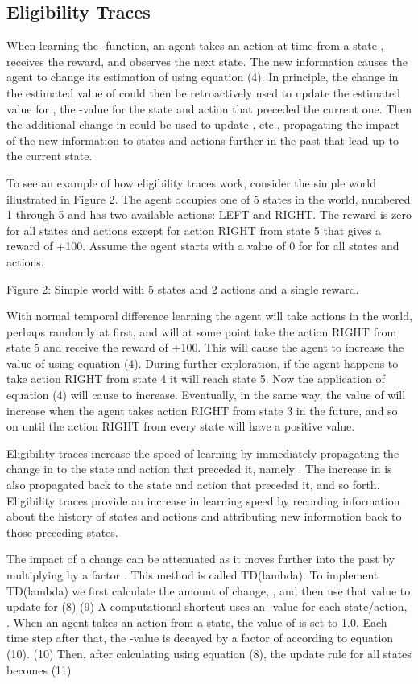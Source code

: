 \subsection{Eligibility Traces}
When learning the  -function, an agent takes an action   at time   from a state  , receives the reward, and observes the next state.  The new information causes the agent to change its estimation of   using equation (4).  In principle, the change in the estimated value of   could then be retroactively used to update the estimated value for  , the  -value for the state and action that preceded the current one.  Then the additional change in   could be used to update  , etc., propagating the impact of the new information to states and actions further in the past that lead up to the current state.

To see an example of how eligibility traces work, consider the simple world illustrated in Figure 2.  The agent occupies one of 5 states in the world, numbered 1 through 5 and has two available actions: LEFT and RIGHT.  The reward is zero for all states and actions except for action RIGHT from state 5 that gives a reward of +100.  Assume the agent starts with a value of 0 for   for all states and actions.
 
Figure 2: Simple world with 5 states and 2 actions and a single reward.

With normal temporal difference learning the agent will take actions in the world, perhaps randomly at first, and will at some point take the action RIGHT from state 5 and receive the reward of +100.  This will cause the agent to increase the value of   using equation (4).  During further exploration, if the agent happens to take action RIGHT from state 4 it will reach state 5.  Now the application of equation (4) will cause   to increase.  Eventually, in the same way, the value of   will increase when the agent takes action RIGHT from state 3 in the future, and so on until the action RIGHT from every state will have a positive value.

Eligibility traces increase the speed of learning by immediately propagating the change in  to the state and action that preceded it, namely  .  The increase in   is also propagated back to the state and action that preceded it, and so forth.  Eligibility traces provide an increase in learning speed by recording information about the history of states and actions and attributing new information back to those preceding states.

The impact of a change can be attenuated as it moves further into the past by multiplying by a factor  .  This method is called TD({lambda}).  To implement TD({lambda}) we first calculate the amount of change, , and then use that value to update   for  
	 	(8)
	 	(9)
A computational shortcut uses an  -value for each state/action,  .  When an agent takes an action from a state, the value of   is set to 1.0.  Each time step after that, the  -value is decayed by a factor of   according to equation (10).
	 	(10)
Then, after calculating   using equation (8), the update rule for all states becomes
	 	(11)

